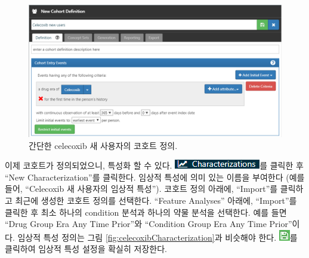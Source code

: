 \documentclass[10.5pt]{book}
\theoremstyle{definition}
\theoremstyle{definition}
\theoremstyle{definition}
\theoremstyle{remark}
\begin{document}
\begin{figure}

{\centering \includegraphics[width=1\linewidth]{images/SuggestedAnswers/celecoxibCohortDefinition} 

}

\caption{간단한 celecoxib 새 사용자의 코호트 정의.}\label{fig:celecoxibCohortDefinition}
\end{figure}

이제 코호트가 정의되었으니, 특성화 할 수 있다.
\includegraphics{images/Characterization/atlasCharacterizationMenuItem.png}를
클릭한 후 ``New Characterization''를 클릭한다. 임상적 특성에 의미 있는
이름을 부여한다 (예를 들어, ``Celecoxib 새 사용자의 임상적 특성'').
코호트 정의 아래에, ``Import''를 클릭하고 최근에 생성한 코호트 정의를
선택한다. ``Feature Analyses'' 아래에, ``Import''를 클릭한 후 최소
하나의 condition 분석과 하나의 약물 분석을 선택한다. 예를 들면 ``Drug
Group Era Any Time Prior''와 ``Condition Group Era Any Time Prior''이다.
임상적 특성 정의는 그림 \ref{fig:celecoxibCharacterization}과 비슷해야
한다. \includegraphics{images/Cohorts/save.png}를 클릭하여 임상적 특성
설정을 확실히 저장한다.
\end{document}
